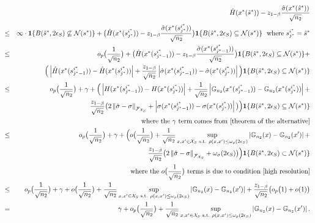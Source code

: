 \documentclass[mnsc,blindrev]{informs4} %
\newcommand{\norm}[1]{\left \Vert #1 \right\Vert}
\newcommand{\abs}[1]{\left \vert #1 \right\vert}
\begin{document}
\begin{eqnarray*}
&&\hat H(x^*(\hat s^*))-z_{1-\beta}\frac{\hat \sigma(x^*(\hat s^*))}{\sqrt{n_2}}\\
&\leq& \infty\cdot\mathbf{1}\{B(\hat s^*,2\epsilon_S)\not\subseteq \mathcal N(s^*)\}+\big(\hat H(x^*(s^{i^*}_{j^*}))-z_{1-\beta}\frac{\hat \sigma(x^*(s^{i^*}_{j^*}))}{\sqrt{n_2}}\big)\mathbf{1}\{B(\hat s^*,2\epsilon_S)\subseteq \mathcal N(s^*)\}\text{\ \ where }s^{i^*}_{j^*}=\hat s^*\\
&\leq& o_p\big(\frac{1}{\sqrt{n_2}}\big)+\big(\hat H(x^*(s^{i^*}_{j^*-1}))-z_{1-\beta}\frac{\hat \sigma(x^*(s^{i^*}_{j^*-1}))}{\sqrt{n_2}}\big)\mathbf{1}\{B(\hat s^*,2\epsilon_S)\subseteq \mathcal N(s^*)\}+\\
&& \hspace{5ex}\Big(\abs{\hat H(x^*(s^{i^*}_{j^*-1}))-\hat H(x^*(s^{i^*}_{j^*}))}+\frac{z_{1-\beta}}{\sqrt{n_2}}\abs{\hat \sigma(x^*(s^{i^*}_{j^*-1}))-\hat \sigma(x^*(s^{i^*}_{j^*}))}\Big)\mathbf{1}\{B(\hat s^*,2\epsilon_S)\subseteq \mathcal N(s^*)\}\\
&\leq& o_p\big(\frac{1}{\sqrt{n_2}}\big)+\gamma+\Big(\abs{H(x^*(s^{i^*}_{j^*-1}))-H(x^*(s^{i^*}_{j^*}))}+\frac{1}{\sqrt{n_2}}\abs{\mathbb G_{n_2}(x^*(s^{i^*}_{j^*-1}))-\mathbb G_{n_2}(x^*(s^{i^*}_{j^*}))}+\\
&&\hspace{5ex}\frac{z_{1-\beta}}{\sqrt{n_2}}\big(2\norm{\hat\sigma-\sigma}_{\mathcal F_{\mathcal X_S}}+\abs{\sigma(x^*(s^{i^*}_{j^*-1}))-\sigma(x^*(s^{i^*}_{j^*}))}\big)\Big)\mathbf{1}\{B(\hat s^*,2\epsilon_S)\subseteq \mathcal N(s^*)\}\\
&&\hspace{5ex}\text{where the $\gamma$ term comes from \eqref{theorem of the alternative}}\\
&\leq& o_p\big(\frac{1}{\sqrt{n_2}}\big)+\gamma+\Big(o\big(\frac{1}{\sqrt{n_2}}\big)+\frac{1}{\sqrt{n_2}}\sup_{x,x'\in\mathcal X_S\text{ s.t. }\rho(x,x')\leq \omega_{\rho}(2\epsilon_S)}\abs{\mathbb G_{n_2}(x)-\mathbb G_{n_2}(x')}+\\
&&\hspace{5ex}\frac{z_{1-\beta}}{\sqrt{n_2}}\big(2\norm{\hat\sigma-\sigma}_{\mathcal F_{\mathcal X_S}}+\omega_{\sigma}(2\epsilon_S)\big)\Big)\mathbf{1}\{B(\hat s^*,2\epsilon_S)\subset \mathcal N(s^*)\}\\
&&\text{\ \ where the $o\big(\frac{1}{\sqrt{n_2}}\big)$ terms is due to condition \eqref{high resolution}}\\
&\leq& o_p\big(\frac{1}{\sqrt{n_2}}\big)+\gamma+o\big(\frac{1}{\sqrt{n_2}}\big)+\frac{1}{\sqrt{n_2}}\sup_{x,x'\in\mathcal X_S\text{ s.t. }\rho(x,x')\leq \omega_{\rho}(2\epsilon_S)}\abs{\mathbb G_{n_2}(x)-\mathbb G_{n_2}(x')}+\frac{z_{1-\beta}}{\sqrt{n_2}}\big(o_p\big(1)+o(1)\big)\\
&=&\gamma+o_p\big(\frac{1}{\sqrt{n_2}}\big)+\frac{1}{\sqrt{n_2}}\sup_{x,x'\in\mathcal X_S\text{ s.t. }\rho(x,x')\leq \omega_{\rho}(2\epsilon_S)}\abs{\mathbb G_{n_2}(x)-\mathbb G_{n_2}(x')}.
\end{eqnarray*}
\end{document}

